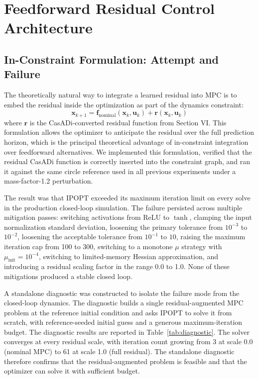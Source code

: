 \documentclass[conference]{IEEEtran}
\begin{document}
\section{Feedforward Residual Control Architecture}

\subsection{In-Constraint Formulation: Attempt and Failure}
The theoretically natural way to integrate a learned residual into MPC is to embed the residual inside the optimization as part of the dynamics constraint:
\begin{equation}
\mathbf{x}_{k+1} = \mathbf{f}_{\text{nominal}}(\mathbf{x}_k, \mathbf{u}_k) + \mathbf{r}(\mathbf{x}_k, \mathbf{u}_k)
\end{equation}
where $\mathbf{r}$ is the CasADi-converted residual function from Section VI. This formulation allows the optimizer to anticipate the residual over the full prediction horizon, which is the principal theoretical advantage of in-constraint integration over feedforward alternatives. We implemented this formulation, verified that the residual CasADi function is correctly inserted into the constraint graph, and ran it against the same circle reference used in all previous experiments under a mass-factor-1.2 perturbation.

The result was that IPOPT exceeded its maximum iteration limit on every solve in the production closed-loop simulation. The failure persisted across multiple mitigation passes: switching activations from ReLU to $\tanh$, clamping the input normalization standard deviation, loosening the primary tolerance from $10^{-3}$ to $10^{-2}$, loosening the acceptable tolerance from $10^{-1}$ to $10$, raising the maximum iteration cap from 100 to 300, switching to a monotone $\mu$ strategy with $\mu_{\text{init}} = 10^{-4}$, switching to limited-memory Hessian approximation, and introducing a residual scaling factor in the range 0.0 to 1.0. None of these mitigations produced a stable closed loop.

A standalone diagnostic was constructed to isolate the failure mode from the closed-loop dynamics. The diagnostic builds a single residual-augmented MPC problem at the reference initial condition and asks IPOPT to solve it from scratch, with reference-seeded initial guess and a generous maximum-iteration budget. The diagnostic results are reported in Table~\ref{tab:diagnostic}. The solver converges at every residual scale, with iteration count growing from 3 at scale 0.0 (nominal MPC) to 61 at scale 1.0 (full residual). The standalone diagnostic therefore confirms that the residual-augmented problem is feasible and that the optimizer can solve it with sufficient budget.
\end{document}
